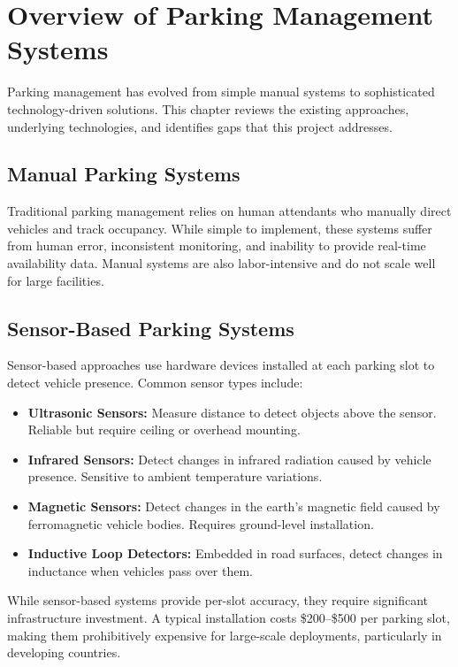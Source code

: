 \documentclass[12pt,a4paper]{report}
\begin{document}
\section{Overview of Parking Management Systems}

Parking management has evolved from simple manual systems to sophisticated technology-driven solutions. This chapter reviews the existing approaches, underlying technologies, and identifies gaps that this project addresses.

\subsection{Manual Parking Systems}

Traditional parking management relies on human attendants who manually direct vehicles and track occupancy. While simple to implement, these systems suffer from human error, inconsistent monitoring, and inability to provide real-time availability data. Manual systems are also labor-intensive and do not scale well for large facilities.

\subsection{Sensor-Based Parking Systems}

Sensor-based approaches use hardware devices installed at each parking slot to detect vehicle presence. Common sensor types include:

\begin{itemize}
    \item \textbf{Ultrasonic Sensors:} Measure distance to detect objects above the sensor. Reliable but require ceiling or overhead mounting.
    \item \textbf{Infrared Sensors:} Detect changes in infrared radiation caused by vehicle presence. Sensitive to ambient temperature variations.
    \item \textbf{Magnetic Sensors:} Detect changes in the earth's magnetic field caused by ferromagnetic vehicle bodies. Requires ground-level installation.
    \item \textbf{Inductive Loop Detectors:} Embedded in road surfaces, detect changes in inductance when vehicles pass over them.
\end{itemize}

While sensor-based systems provide per-slot accuracy, they require significant infrastructure investment. A typical installation costs \$200--\$500 per parking slot, making them prohibitively expensive for large-scale deployments, particularly in developing countries.
\end{document}
